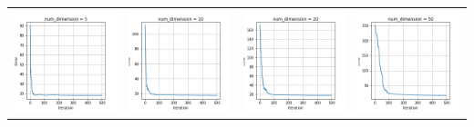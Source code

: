 \documentclass{article}
\begin{document}
\begin{table}[H]
\begin{tabular}{cccc}
\includegraphics[scale=0.3]{RLS-5D.png} &
\includegraphics[scale=0.3]{RLS-10D.png} &
\includegraphics[scale=0.3]{RLS-20D.png} &
\includegraphics[scale=0.3]{RLS-50D.png}

\end{tabular}
\end{table}
\end{document}
